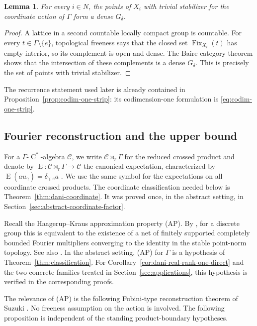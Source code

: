 \documentclass[11pt]{amsart}
\numberwithin{equation}{section}
\newcommand{\rC}{\operatorname{C}}
\newcommand{\rE}{\operatorname{E}}
\newcommand{\Fix}{\operatorname{Fix}}
\newtheorem{lemma}[theorem]{Lemma}
\theoremstyle{definition}
\begin{document}
	\begin{lemma}
		\label{lem:coordinate-action-topologically-free}
		For every $i\in N$, the points of $X_i$ with trivial stabilizer for the
		coordinate action of $\Gamma$ form a dense $G_\delta$.
	\end{lemma}
	
	\begin{proof}
		A lattice in a second countable locally compact group is countable. For every
		$t\in\Gamma\setminus\{e\}$, topological freeness says that the closed set
		$\Fix_{X_i}(t)$ has empty interior, so its complement is open and dense. The
		Baire category theorem shows that the intersection of these complements is a
		dense $G_\delta$. This is precisely the set of points with trivial stabilizer.
	\end{proof}
	
	The recurrence statement used later is already contained in
	Proposition~\ref{prop:codim-one-strip}: its codimension-one formulation is
	\eqref{eq:codim-one-strip}.
	
	\subsection{Fourier reconstruction and the upper bound}
	
	For a $\Gamma$-$\rC^*$-algebra $\mathcal C$, we write
	$\mathcal C\rtimes_r\Gamma$ for the reduced crossed product and denote by
	$\rE:\mathcal C\rtimes_r\Gamma\to\mathcal C$ the canonical expectation,
	characterized by $\rE(au_\gamma)=\delta_{\gamma,e}a$ \cite{BO08}. We use the
	same symbol for the expectations on all coordinate
	crossed products.  The coordinate classification needed below is
	Theorem~\ref{thm:dani-coordinate}. It was proved once, in the abstract setting,
	in Section~\ref{sec:abstract-coordinate-factor}.
	
	Recall the Haagerup--Kraus approximation property (AP). By
	\cite[Theorem~1.9(c)]{HK94}, for a discrete group this is equivalent to the
	existence of a net of finitely supported completely bounded Fourier multipliers
	converging to the identity in the stable point-norm topology. See also
	\cite[Definition~2.3]{Su17}. In the abstract setting,
	{\rm(AP)} for $\Gamma$ is a hypothesis of Theorem~\ref{thm:classification}. For
	Corollary~\ref{cor:dani-real-rank-one-direct} and the
	two concrete families treated in Section~\ref{sec:applications}, this hypothesis
	is verified in the corresponding proofs.
	
	The relevance of {\rm(AP)} is the following Fubini-type reconstruction theorem
	of Suzuki \cite[Proposition~3.4]{Su17}.  No freeness assumption on the action is
	involved. The following proposition is independent of the standing
	product-boundary hypotheses.
	
\end{document}

